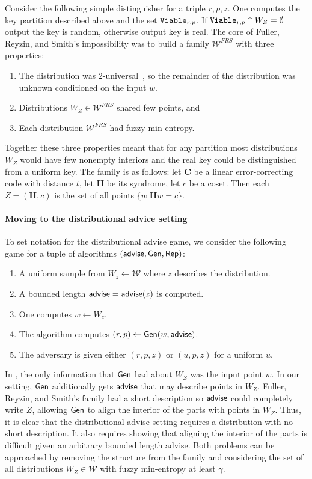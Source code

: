 Consider the following simple distinguisher for a triple $r, p, z$.  One computes the key partition described above and the set $\mathtt{Viable}_{r,p}$. If $\mathtt{Viable}_{r,p} \cap W_Z =\emptyset$ output the key is random, otherwise output key is real.
The core of Fuller, Reyzin, and Smith's impossibility was to build a family $\mathcal{W}^{FRS}$ with three properties:
\begin{enumerate}
\item The distribution was $2$-universal~\cite{carter1977universal}, so the remainder of the distribution was unknown conditioned on the input $w$. 
\item Distributions $W_Z \in \mathcal{W}^{FRS}$ shared few points, and 
\item Each distribution $\mathcal{W}^{FRS}$ had fuzzy min-entropy.
\end{enumerate}
Together these three properties meant that for any partition most distributions $W_Z$ would have few nonempty interiors and the real key could be distinguished from a uniform key.  
The family is as follows: let $\mathbf{C}$ be a linear error-correcting code with distance $t$, let $\mathbf{H}$ be its syndrome, let $c$ be a coset.  Then each $Z = (\mathbf{H}, c)$ is the set of all points $\{w | \mathbf{H} w = c\}$.

\paragraph{Moving to the distributional advice setting}
To set notation for the distributional advise game, we consider the following game for a tuple of algorithms $({\mathsf{advise}}, {\mathsf{Gen}}, {\mathsf{Rep}})$:
\begin{enumerate}
\itemsep0em
\item A uniform sample from $W_z\leftarrow \mathcal{W}$ where $z$ describes the distribution.
\item A bounded length ${\mathsf{advise}} = {\mathsf{advise}}(z)$ is computed.
\item One computes $w\leftarrow W_z$.
\item The algorithm computes $(r, p)\leftarrow {\ensuremath{\mathsf{Gen}}}(w, {\mathsf{advise}})$.
\item The adversary is given either $(r, p, z)$ or $(u, p, z)$ for a uniform $u$.
\end{enumerate}

In \cite{fuller2020fuzzy}, the only information that ${\mathsf{Gen}}$ had about $W_Z$ was the input point $w$.  In our setting, ${\mathsf{Gen}}$ additionally gets ${\mathsf{advise}}$ that may describe points in $W_Z$.  Fuller, Reyzin, and Smith's family had a short description so ${\mathsf{advise}}$ could completely write $Z$, allowing ${\mathsf{Gen}}$ to align the interior of the parts with points in $W_Z$.  Thus, it is clear that the distributional advise setting requires a distribution with no short description.  It also requires showing that aligning the interior of the parts is difficult given an arbitrary bounded length advise.  Both problems can be approached by removing the structure from the family and considering the set of all distributions $W_Z\in\mathcal{W}$ with fuzzy min-entropy at least $\gamma$. 

